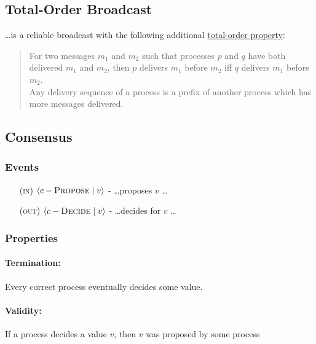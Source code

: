 \documentclass{article}
\begin{document}
\begin{adjustwidth}{2em}{2em}
		\subsection{Total-Order Broadcast}
		\begin{adjustwidth}{2em}{2em}
			\ldots is a reliable broadcast with the following additional \underline{total-order property}:
			\begin{quote}
				For two messages $m_1$ and $m_2$ such that processes $p$ and $q$ have both delivered $m_1$ and $m_2$, then $p$ delivers $m_1$ before $m_2$ iff $q$ delivers $m_1$ before $m_2$. \\
				Any delivery sequence of a process is a prefix of another process which has more messages delivered.
			\end{quote}
		\end{adjustwidth}
		\subsection{Consensus}
		\begin{adjustwidth}{2em}{2em}
			\subsubsection{Events}
			\begin{adjustwidth}{2em}{}
				\begin{enumerate}
					\item[(\textsc{in})] $\langle c-\textsc{Propose} \mid v \rangle$ - \ldots proposes $v$ \ldots
					\item[(\textsc{out})] $\langle c-\textsc{Decide} \mid v \rangle$ - \ldots decides for $v$ \ldots
				\end{enumerate}
			\end{adjustwidth}
			\subsubsection{Properties}
			\begin{adjustwidth}{2em}{}
				\hfill \vspace{-1cm}
				\paragraph{Termination:}
				\begin{adjustwidth}{1em}{}
					Every correct process eventually decides some value.
				\end{adjustwidth}
				\paragraph{Validity:}
				\begin{adjustwidth}{1em}{}
					If a process decides a value $v$, then $v$ was proposed by some process
				\end{adjustwidth}

\end{adjustwidth}
\end{adjustwidth}
\end{adjustwidth}
\end{document}
